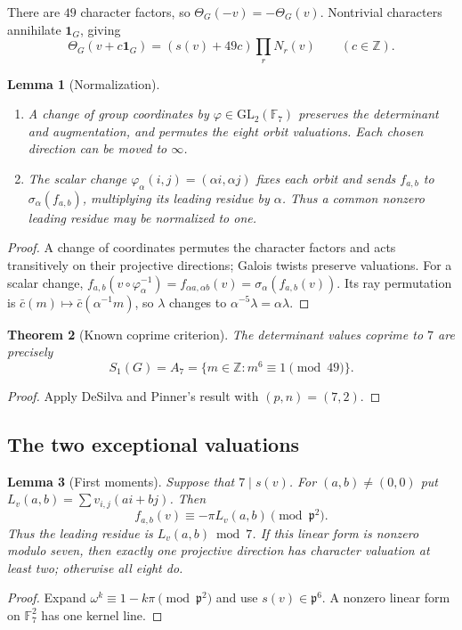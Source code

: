 \documentclass[11pt]{amsart}
\theoremstyle{plain}
\newtheorem{theorem}{Theorem}[section]
\newtheorem{lemma}[theorem]{Lemma}
\theoremstyle{definition}
\numberwithin{equation}{section}
\newcommand{\Z}{\mathbb Z}
\newcommand{\F}{\mathbb F}
\newcommand{\GG}{G}
\newcommand{\pp}{\mathfrak p}
\begin{document}
There are $49$ character factors, so $\Theta_\GG(-v)=-\Theta_\GG(v)$.
Nontrivial characters annihilate $\mathbf1_\GG$, giving
\begin{equation}\label{eq:shift}
 \Theta_\GG(v+c\mathbf1_\GG)
   =(s(v)+49c)\prod_rN_r(v)\qquad(c\in\Z).
\end{equation}

\begin{lemma}[Normalization]\label{lem:normalize}
\begin{enumerate}
\item[(i)] A change of group coordinates by $\varphi\in\mathrm{GL}_2(\F_7)$
preserves the determinant and augmentation, and permutes the eight
orbit valuations. Each chosen direction can be moved to $\infty$.
\item[(ii)] The scalar change $\varphi_\alpha(i,j)=(\alpha i,\alpha j)$
fixes each orbit and sends $f_{a,b}$ to $\sigma_\alpha(f_{a,b})$,
multiplying its leading residue by $\alpha$. Thus a common nonzero
leading residue may be normalized to one.
\end{enumerate}
\end{lemma}
\begin{proof}
A change of coordinates permutes the character factors and acts
transitively on their projective directions; Galois twists preserve
valuations. For a scalar change,
$f_{a,b}(v\circ\varphi_\alpha^{-1})=f_{\alpha a,\alpha b}(v)
=\sigma_\alpha(f_{a,b}(v))$. Its ray permutation is
$\bar c(m)\mapsto\bar c(\alpha^{-1}m)$, so
$\lambda$ changes to $\alpha^{-5}\lambda=\alpha\lambda$.
\end{proof}

\begin{theorem}[Known coprime criterion]\label{thm:coprime}
The determinant values coprime to $7$ are precisely
\[
 S_1(\GG)=A_7=\{m\in\Z:m^6\equiv1\pmod{49}\}.
\]
\end{theorem}
\begin{proof}
Apply DeSilva and Pinner's result
\cite[Lemmas~2.1--2.2]{DeSilvaPinner2014} with $(p,n)=(7,2)$.
\end{proof}

\subsection{The two exceptional valuations}\label{sec:valuation}

\begin{lemma}[First moments]\label{lem:second-order}\label{lem:nonreal}
Suppose that $7\mid s(v)$. For $(a,b)\ne(0,0)$ put
$L_v(a,b)=\sum v_{i,j}(ai+bj)$. Then
\[
 f_{a,b}(v)\equiv-\pi L_v(a,b)\pmod{\pp^2}.
\]
Thus the leading residue is $L_v(a,b)\bmod7$.
If this linear form is nonzero modulo seven, then exactly one projective
direction has character valuation at least two; otherwise all eight do.
\end{lemma}
\begin{proof}
Expand $\omega^k\equiv1-k\pi\pmod{\pp^2}$ and use
$s(v)\in\pp^6$. A nonzero linear form on $\F_7^2$ has one kernel line.
\end{proof}
\end{document}
